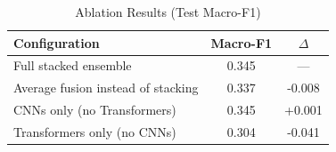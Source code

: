 \begin{table}[t]
\caption{Ablation Results (Test Macro-F1)}
\label{tab:ablation}
\centering
\begin{tabular}{lcc}
\toprule
Configuration & Macro-F1 & $\Delta$ \\
\midrule
Full stacked ensemble & 0.345 & --- \\
\quad Average fusion instead of stacking & 0.337 & -0.008 \\
\quad CNNs only (no Transformers) & 0.345 & +0.001 \\
\quad Transformers only (no CNNs) & 0.304 & -0.041 \\
\bottomrule
\end{tabular}
\end{table}
